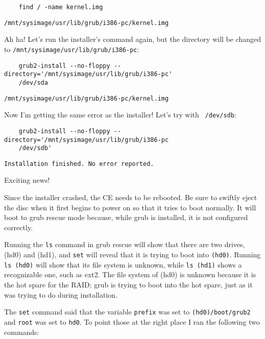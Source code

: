 \documentclass[12pt]{article}
\begin{document}
\begin{tcolorbox}[colback=white, colframe=black]
  \begin{verbatim}
    find / -name kernel.img
  \end{verbatim}
  \tcblower
  {\tt /mnt/sysimage/usr/lib/grub/i386-pc/kernel.img}
\end{tcolorbox}

Ah ha! Let's run the installer's command again, but the directory will be
changed to {\tt /mnt/sysimage/usr/lib/grub/i386-pc}:

\begin{tcolorbox}[colback=white, colframe=black]
  \begin{verbatim}
    grub2-install --no-floppy --directory='/mnt/sysimage/usr/lib/grub/i386-pc'
    /dev/sda
  \end{verbatim}
  \tcblower
  {\tt /mnt/sysimage/usr/lib/grub/i386-pc/kernel.img}
\end{tcolorbox}

Now I'm getting the same error as the installer! Let's try with {\tt
  /dev/sdb}:

\begin{tcolorbox}[colback=white, colframe=black]
  \begin{verbatim}
    grub2-install --no-floppy --directory='/mnt/sysimage/usr/lib/grub/i386-pc
    /dev/sdb'
  \end{verbatim}
  \tcblower
  {\tt Installation finished. No error reported.}
\end{tcolorbox}

Exciting news!

\qq Since the installer crashed, the CE needs to be rebooted. Be sure to swiftly
eject the disc when it first begins to power on so that it tries to boot
normally. It will boot to grub rescue mode because, while grub is installed, it
is not configured correctly.

\qq Running the {\tt ls} command in grub rescue will show that there are two
drives, (hd0) and (hd1), and {\tt set} will reveal that it is trying to boot into
{\tt (hd0)}. Running {\tt ls (hd0)} will show that its file system is unknown,
while {\tt ls (hd1)} shows a recognizable one, such as ext2. The file system of
(hd0) is unknown because it is the hot spare for the RAID; grub is trying to
boot into the hot spare, just as it was trying to do during installation.

\qq The {\tt set} command said that the variable {\tt prefix} was set to
{\tt (hd0)/boot/grub2} and {\tt root} was set to {\tt hd0}. To point those at the
right place I ran the following two commands:
\end{document}
